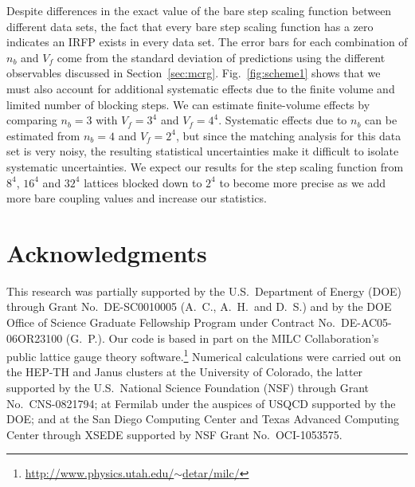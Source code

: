 \documentclass{PoS}
\newcommand{\fig}[1]{Fig.~\ref{#1}}
\newcommand{\secref}[1]{Section~\ref{#1}}
\begin{document}
Despite differences in the exact value of the bare step scaling function between different data sets, the fact that every bare step scaling function has a zero indicates an IRFP exists in every data set.
The error bars for each combination of $n_b$ and $V_f$ come from the standard deviation of predictions using the different observables discussed in \protect\secref{sec:mcrg}.
\fig{fig:scheme1} shows that we must also account for additional systematic effects due to the finite volume and limited number of blocking steps.
We can estimate finite-volume effects by comparing $n_b = 3$ with $V_f = 3^4$ and $V_f = 4^4$.
Systematic effects due to $n_b$ can be estimated from $n_b = 4$ and $V_f = 2^4$, but since the matching analysis for this data set is very noisy, the resulting statistical uncertainties make it difficult to isolate systematic uncertainties.
We expect our results for the step scaling function from $8^4$, $16^4$ and $32^4$ lattices blocked down to $2^4$ to become more precise as we add more bare coupling values and increase our statistics.



\section*{Acknowledgments} %
This research was partially supported by the U.S.~Department of Energy (DOE) through Grant No.~DE-SC0010005 (A.~C., A.~H.\ and D.~S.) and by the DOE Office of Science Graduate Fellowship Program under Contract No.~DE-AC05-06OR23100 (G.~P.).
Our code is based in part on the MILC Collaboration's public lattice gauge theory software.\footnote{\href{http://www.physics.utah.edu/~detar/milc/}{http://www.physics.utah.edu/$\sim$detar/milc/}}
Numerical calculations were carried out on the HEP-TH and Janus clusters at the University of Colorado, the latter supported by the U.S.~National Science Foundation (NSF) through Grant No.~CNS-0821794; at Fermilab under the auspices of USQCD supported by the DOE; and at the San Diego Computing Center and Texas Advanced Computing Center through XSEDE supported by NSF Grant No.~OCI-1053575.





\end{document}
